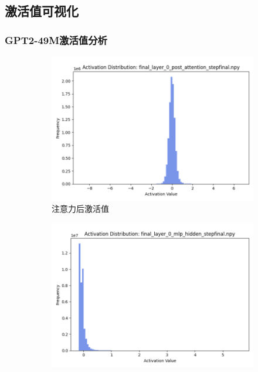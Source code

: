 \documentclass{article}
\begin{document}
\vspace{0.5cm}

\subsection{激活值可视化}

\subsubsection{GPT2-49M激活值分析}
\begin{figure}[H]
\centering
\begin{subfigure}[b]{0.3\textwidth}
\includegraphics[width=\textwidth]{../visualize/activations/GPT2-49M/final_layer_0_post_attention_stepfinal.png}
\caption{注意力后激活值}
\label{fig:act_49m_l0_post}
\end{subfigure}
\hfill
\begin{subfigure}[b]{0.3\textwidth}
\includegraphics[width=\textwidth]{../visualize/activations/GPT2-49M/final_layer_0_mlp_hidden_stepfinal.png}

\end{subfigure}
\end{figure}
\end{document}
